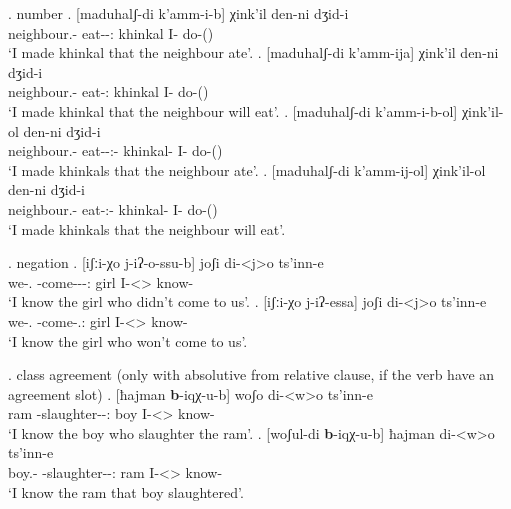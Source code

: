 \ex. number
	\ag. [maduhalʃ-di k'amm-i-b] χink'il den-ni dʒid-i\\
			{neighbour.\Obl-\Erg} {eat-\Pst-\Ptcp:\Pst} {khinkal}  {I-\Erg} {do-\Pst(\Aor)}\\
		 \glt    `I made khinkal that the neighbour ate'.
	\bg. [maduhalʃ-di k'amm-ija] χink'il den-ni dʒid-i\\
			{neighbour.\Obl-\Erg} {eat-\Ptcp:\Fut} {khinkal}  {I-\Erg} {do-\Pst(\Aor)}\\
		 \glt    `I made khinkal that the neighbour will eat'.	
	\bg. [maduhalʃ-di k'amm-i-b-ol] χink'il-ol den-ni dʒid-i\\
			{neighbour.\Obl-\Erg} {eat-\Pst-\Ptcp:\Pst-\Pl} {khinkal-\Pl}  {I-\Erg} {do-\Pst(\Aor)}\\
		 \glt    `I made khinkals that the neighbour ate'.
	\bg. [maduhalʃ-di k'amm-ij-ol] χink'il-ol den-ni dʒid-i\\
			{neighbour.\Obl-\Erg} {eat-\Ptcp:\Fut-\Pl} {khinkal-\Pl}  {I-\Erg} {do-\Pst(\Aor)}\\
		 \glt    `I made khinkals that the neighbour will eat'.	

\ex. negation
	\ag. [iʃːi-χo j-iʔ-o-ssu-b] joʃi di-<j>o ts'inn-e \\
		  {we-\Add.\Lat} {\F-come-\Pst-\Neg-\Ptcp:\Pst} {girl} {I-<\F>\Aff} {know-\Hab}\\
		 \glt    `I know the girl who didn't come to us'.
	\bg. [iʃːi-χo j-iʔ-essa] joʃi di-<j>o ts'inn-e \\
		  {we-\Add.\Lat} {\F-come-\Neg.\Ptcp:\Fut} {girl} {I-<\F>\Aff} {know-\Hab}\\
		 \glt    `I know the girl who won't come to us'.
		 
\ex. class agreement (only with absolutive from relative clause, if the verb have an agreement slot)
	\ag. [ħajman \textbf{b}-iqχ-u-b] woʃo di-<w>o ts'inn-e \\
			ram {\Nanf-slaughter-\Pst-\Ptcp:\Pst} boy {I-<\M>\Aff} {know-\Hab}\\
			\glt `I know the boy who slaughter the ram'.
	\bg. [woʃul-di \textbf{b}-iqχ-u-b] ħajman di-<w>o ts'inn-e \\
			{boy.\Obl-\Erg} {\Nanf-slaughter-\Pst-\Ptcp:\Pst} ram {I-<\M>\Aff} {know-\Hab}\\
			\glt `I know the ram that boy slaughtered'.	
			
